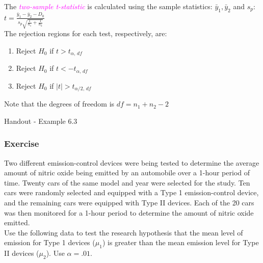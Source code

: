 \documentclass[xcolor=dvipsnames,12pt]{beamer}
\begin{document}
\begin{frame}
The \textcolor{magenta}{\textit{two-sample t-statistic}} is calculated using the sample statistics: $\bar{y}_1, \bar{y}_2$ and $s_p$:\\
\vspace{5mm}
\hspace{35mm}
 $ t =\frac{\bar{y}_1 - \bar{y}_2 - D_0}{s_p\sqrt{\frac{1}{n_1}+\frac{1}{n_2}}}$\\
\vspace{5mm}
The rejection regions for each test, respectively, are:
\begin{enumerate}
\item Reject $H_0$  if  $t > t_{\alpha,\,df}$ 
\item Reject $H_0$  if  $t < -t_{\alpha,\,df}$
\item Reject $H_0$  if  $|t| > t_{\alpha/2,\,df}$
\end{enumerate}
Note that the degrees of freedom is $df=n_1+n_2-2$
\end{frame}



\begin{frame}
Handout - Example 6.3
\end{frame}

%




\begin{frame}
\frametitle{Exercise}
 Two different emission-control devices were being
tested to determine the average amount of nitric oxide being emitted
by an automobile over a 1-hour period of time.  Twenty cars of the
same model and year were selected for the study.  Ten cars were
randomly selected and equipped with a Type 1 emission-control device,
and the remaining cars were equipped with Type II devices. Each of
the 20 cars was then monitored for a 1-hour period to determine
the amount of nitric oxide emitted.\\[.1in]
Use the following data to test the research hypothesis that the mean
level of emission for Type 1 devices ($\mu_1$) is greater than the
mean emission level for Type II devices ($\mu_2$).  Use $\alpha=.01$.\\[.1in]
\end{frame}
\end{document}
